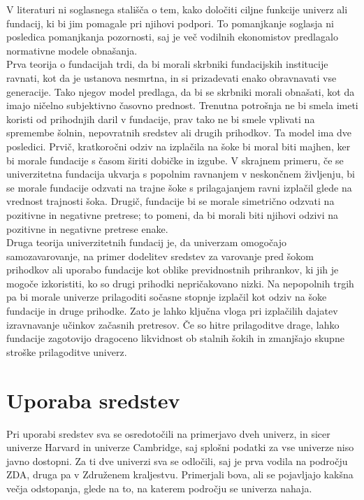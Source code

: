 \documentclass[12pt, a4paper]{article}
\begin{document}
V literaturi ni soglasnega stališča o tem, kako določiti ciljne funkcije univerz ali fundacij, ki bi jim pomagale pri njihovi podpori. To pomanjkanje soglasja ni posledica pomanjkanja pozornosti, saj je več vodilnih ekonomistov predlagalo normativne modele obnašanja. \\

Prva teorija o fundacijah trdi, da bi morali skrbniki fundacijskih institucije ravnati, kot da je ustanova nesmrtna, in si prizadevati enako obravnavati vse generacije. Tako njegov model predlaga, da bi se skrbniki morali obnašati, kot da imajo ničelno subjektivno časovno prednost. Trenutna potrošnja ne bi smela imeti koristi od prihodnjih daril v fundacije, prav tako ne bi smele vplivati na spremembe šolnin, nepovratnih sredstev ali drugih prihodkov. Ta model ima dve posledici. Prvič, kratkoročni odziv na izplačila na šoke bi moral biti majhen, ker bi morale fundacije s časom širiti dobičke in izgube. V skrajnem primeru, če se univerzitetna fundacija ukvarja s popolnim ravnanjem v neskončnem življenju, bi se morale fundacije odzvati na trajne šoke s prilagajanjem ravni izplačil glede na vrednost trajnosti šoka. Drugič, fundacije bi se morale simetrično odzvati na pozitivne in negativne pretrese; to pomeni, da bi morali biti njihovi odzivi na pozitivne in negativne pretrese enake.\\

Druga teorija univerzitetnih fundacij je, da univerzam omogočajo samozavarovanje, na primer dodelitev sredstev za varovanje pred šokom prihodkov ali uporabo fundacije kot oblike previdnostnih prihrankov, ki jih je mogoče izkoristiti, ko so drugi prihodki nepričakovano nizki. Na nepopolnih trgih pa bi morale univerze prilagoditi sočasne stopnje izplačil kot odziv na šoke fundacije in druge prihodke. Zato je lahko ključna vloga pri izplačilih dajatev izravnavanje učinkov začasnih pretresov. Če so hitre prilagoditve drage, lahko fundacije zagotovijo dragoceno likvidnost ob stalnih šokih in zmanjšajo skupne stroške prilagoditve univerz. \cite{soki}\\


\section[Uporaba sredstev]{Uporaba sredstev}

Pri uporabi sredstev sva se osredotočili na primerjavo dveh univerz, in sicer univerze Harvard in univerze Cambridge, saj splošni podatki za vse univerze niso javno dostopni. Za ti dve univerzi sva se odločili, saj je prva vodila na področju ZDA, druga pa v Združenem kraljestvu. Primerjali bova, ali se pojavljajo kakšna večja odstopanja, glede na to, na katerem področju se univerza nahaja. 
\end{document}
